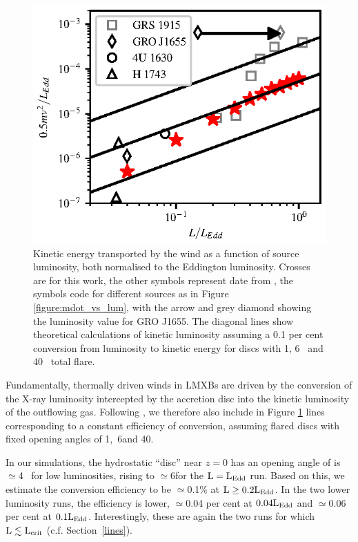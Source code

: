 \documentclass[a4paper,fleqn,usenatbib]{mnras}
\begin{document}
\begin{figure}
\includegraphics[width=\columnwidth]{figures/fig7_lum_vs_ke_ponti.eps}
\caption{Kinetic energy transported by the wind  as a function of source luminosity, both
normalised to the Eddington luminosity. Crosses are for this work, the other symbols represent
date from
\protect\cite{2016AN....337..512P}, the symbols code for different sources as in Figure \ref{figure:mdot_vs_lum},
with the arrow and grey diamond showing the \protect\cite{2016ApJ...823..159S} luminosity
value for GRO J1655.
The diagonal lines show theoretical calculations of kinetic luminosity assuming a 0.1 per cent conversion
from luminosity to kinetic energy for discs with 1\degree, 6\degree~ and 40\degree~ total flare.}
\label{figure:ke_vs_lum}
\end{figure}

Fundamentally, thermally driven winds
in LMXBs are driven by the conversion of the X-ray luminosity
intercepted by the accretion disc into the kinetic luminosity of the
outflowing gas. Following \citep{2016AN....337..512P}, we therefore
also include in Figure \ref{figure:ke_vs_lum} lines corresponding to a
constant efficiency of conversion, assuming flared discs with fixed
opening angles of 1\degree,~6\degree and 40\degree.

In our simulations, the hydrostatic ``disc'' near $z =
0$ has an opening angle of is $\simeq$4\degree~ for low luminosities,
rising to $\simeq$6\degree for  the $\rm{L=L_{Edd}}$ run. Based on
this, we estimate the conversion efficiency to be 
$\simeq$0.1\% at $\rm{L \geq 0.2L_{Edd}}$. In the two lower
luminosity runs, the efficiency is lower, $\simeq$0.04 per cent at
$\rm{0.04L_{Edd}}$ and $\simeq$0.06 per cent at
$\rm{0.1L_{Edd}}$. Interestingly, these are again the two runs for
which $\rm{ L \lesssim L_{crit}}$ (c.f. Section~\ref{lines}).
\end{document}

